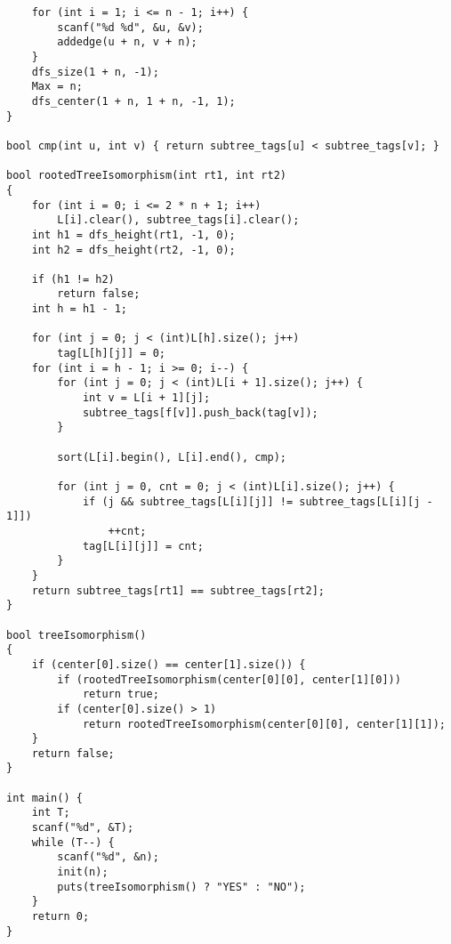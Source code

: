 \documentclass[twocolumn,a4]{article}
\begin{document}
\begin{lstlisting}
    for (int i = 1; i <= n - 1; i++) {
        scanf("%d %d", &u, &v);
        addedge(u + n, v + n);
    }
    dfs_size(1 + n, -1);
    Max = n;
    dfs_center(1 + n, 1 + n, -1, 1);
}

bool cmp(int u, int v) { return subtree_tags[u] < subtree_tags[v]; }

bool rootedTreeIsomorphism(int rt1, int rt2) 
{
    for (int i = 0; i <= 2 * n + 1; i++) 
        L[i].clear(), subtree_tags[i].clear();
    int h1 = dfs_height(rt1, -1, 0);
    int h2 = dfs_height(rt2, -1, 0);

    if (h1 != h2) 
        return false;
    int h = h1 - 1;

    for (int j = 0; j < (int)L[h].size(); j++) 
        tag[L[h][j]] = 0;
    for (int i = h - 1; i >= 0; i--) {
        for (int j = 0; j < (int)L[i + 1].size(); j++) {
            int v = L[i + 1][j];
            subtree_tags[f[v]].push_back(tag[v]);
        }

        sort(L[i].begin(), L[i].end(), cmp);

        for (int j = 0, cnt = 0; j < (int)L[i].size(); j++) {
            if (j && subtree_tags[L[i][j]] != subtree_tags[L[i][j - 1]]) 
                ++cnt;
            tag[L[i][j]] = cnt;
        }
    }
    return subtree_tags[rt1] == subtree_tags[rt2];
}

bool treeIsomorphism() 
{
    if (center[0].size() == center[1].size()) {
        if (rootedTreeIsomorphism(center[0][0], center[1][0])) 
            return true;
        if (center[0].size() > 1)
            return rootedTreeIsomorphism(center[0][0], center[1][1]);
    }
    return false;
}

int main() {
    int T;
    scanf("%d", &T);
    while (T--) {
        scanf("%d", &n);
        init(n);
        puts(treeIsomorphism() ? "YES" : "NO");
    }
    return 0;
}
\end{lstlisting}
\end{document}
